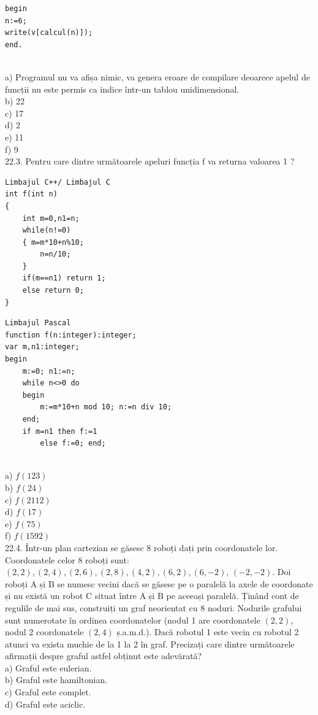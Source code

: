 {{\begin{verbatim}
begin 
n:=6; 
write(v[calcul(n)]); 
end. 
\end{verbatim}
\\
a) Programul nu va afișa nimic, va genera eroare de compilare deoarece apelul de funcții nu este permis ca indice într-un tablou unidimensional.
\\
b) 22
\\
c) 17
\\
d) 2
\\
e) 11
\\
f) 9
\\
22.3. Pentru care dintre următoarele apeluri funcția f va returna valoarea 1 ?
\begin{verbatim}
Limbajul C++/ Limbajul C
int f(int n)
{
    int m=0,n1=n;
    while(n!=0)
    { m=m*10+n%10;
        n=n/10;
    }
    if(m==n1) return 1;
    else return 0;
}
\end{verbatim}
\begin{verbatim}
Limbajul Pascal
function f(n:integer):integer;
var m,n1:integer;
begin
    m:=0; n1:=n;
    while n<>0 do
    begin
        m:=m*10+n mod 10; n:=n div 10;
    end;
    if m=n1 then f:=1
        else f:=0; end;
\end{verbatim}
\\
a) $f(123)$
\\
b) $f(24)$
\\
c) $f(2112)$
\\
d) $f(17)$
\\
e) $f(75)$
\\
f) $f(1592)$
\\
22.4. Într-un plan cartezian se găsesc 8 roboți dați prin coordonatele lor. Coordonatele celor 8 roboți sunt: $(2,2),(2,4),(2,6),(2,8),(4,2),(6,2),(6,-2)$, $(-2,-2)$. Doi roboți A și B se numesc vecini dacă se găsesc pe o paralelă la axele de coordonate și nu există un robot C situat între A și B pe aceeași paralelă. Ținând cont de regulile de mai sus, construiți un graf neorientat cu 8 noduri. Nodurile grafului sunt numerotate în ordinea coordonatelor (nodul 1 are coordonatele $(2,2)$, nodul 2 coordonatele $(2,4)$ ș.a.m.d.). Dacă robotul 1 este vecin cu robotul 2 atunci va exista muchie de la 1 la 2 în graf.
Precizați care dintre următoarele afirmații despre graful astfel obținut este adevărată?
\\
a) Graful  
este  
eulerian.
\\
b) Graful 
este 
hamiltonian.
\\
c) Graful  
este  
complet. 
\\
d) Graful 
este 
aciclic.
}}

